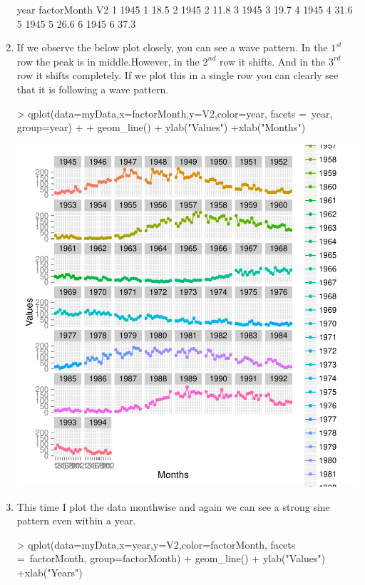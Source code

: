 \documentclass{article}
\begin{document}
\begin{enumerate}
\begin{Schunk}
\begin{Soutput}
  year factorMonth   V2
1 1945           1 18.5
2 1945           2 11.8
3 1945           3 19.7
4 1945           4 31.6
5 1945           5 26.6
6 1945           6 37.3
\end{Soutput}
\end{Schunk}
\item If we observe the below plot closely, you can see a wave pattern. In the $1^{st}$ row the peak is in middle.However, in the $2^{nd}$ row it shifts. And in the $3^{rd}$ row it shifts completely. If we plot this in a single row you can clearly see that it is following a wave pattern. \\
\begin{Schunk}
\begin{Sinput}
> qplot(data=myData,x=factorMonth,y=V2,color=year, facets =~year, group=year) + 
+ geom_line() + ylab("Values") +xlab("Months")
\end{Sinput}
\end{Schunk}
\includegraphics{debseal_HW4-002}
\item This time I plot the data monthwise and again we can see a strong sine pattern even within a year. \\
\begin{Schunk}
\begin{Sinput}
> qplot(data=myData,x=year,y=V2,color=factorMonth, facets =~factorMonth, group=factorMonth) + geom_line() + ylab("Values") +xlab("Years")

\end{Sinput}
\end{Schunk}
\end{enumerate}
\end{document}
